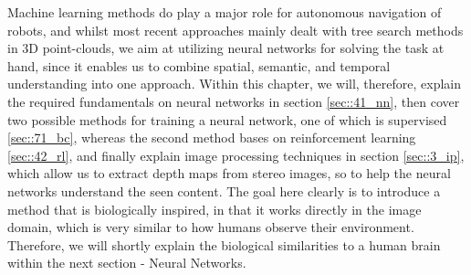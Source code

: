 \FloatBarrier
\label{sec::4_ml}





Machine learning methods do play a major role for autonomous navigation of robots, and whilst most recent approaches mainly dealt with tree search methods in 3D point-clouds, we aim at utilizing neural networks for solving the task at hand, since it enables us to combine spatial, semantic, and temporal understanding into one approach. Within this chapter, we will, therefore, explain the required fundamentals on neural networks in section \ref{sec::41_nn}, then cover two possible methods for training a neural network, one of which is supervised \ref{sec::71_bc}, whereas the second method bases on reinforcement learning \ref{sec::42_rl}, and finally explain image processing techniques in section \ref{sec::3_ip}, which allow us to extract depth maps from stereo images, so to help the neural networks understand the seen content. The goal here clearly is to introduce a method that is biologically inspired, in that it works directly in the image domain, which is very similar to how humans observe their environment. Therefore, we will shortly explain the biological similarities to a human brain within the next section - Neural Networks.